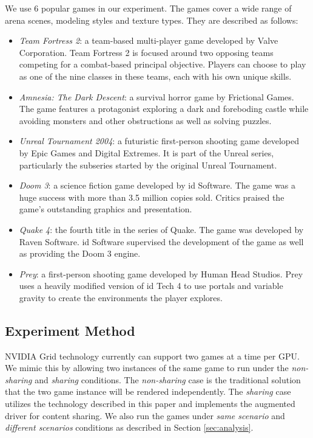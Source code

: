 \documentclass[pageno]{jpaper}
\begin{document}
We use 6 popular games in our experiment. The games cover a wide range of arena scenes, modeling styles and texture types. They are described as follows:
\begin{itemize}
	\item \emph{Team Fortress 2}: a team-based multi-player game developed by Valve Corporation. Team Fortress 2 is focused around two opposing teams competing for a combat-based principal objective. Players can choose to play as one of the nine classes in these teams, each with his own unique skills.
	\item \emph{Amnesia: The Dark Descent}: a survival horror game by Frictional Games. The game features a protagonist exploring a dark and foreboding castle while avoiding monsters and other obstructions as well as solving puzzles.
    \item \emph{Unreal Tournament 2004}: a futuristic first-person shooting game developed by Epic Games and Digital Extremes. It is part of the Unreal series, particularly the subseries started by the original Unreal Tournament.
    \item \emph{Doom 3}: a science fiction game developed by id Software. The game was a huge success with more than 3.5 million copies sold. Critics praised the game's outstanding graphics and presentation.
    \item \emph{Quake 4}: the fourth title in the series of Quake. The game was developed by Raven Software. id Software supervised the development of the game as well as providing the Doom 3 engine.
    \item \emph{Prey}: a first-person shooting game developed by Human Head Studios. Prey uses a heavily modified version of id Tech 4 to use portals and variable gravity to create the environments the player explores.
\end{itemize}

\subsection{Experiment Method}

NVIDIA Grid technology \cite{nvgrid} currently can support two games at a time per GPU. We mimic this by allowing two instances of the same game to run under the \emph{non-sharing} and \emph{sharing} conditions. The \emph{non-sharing} case is the traditional solution that the two game instance will be rendered independently. The \emph{sharing} case utilizes the technology described in this paper and implements the augmented driver for content sharing. We also run the games under \emph{same scenario} and \emph{different scenarios} conditions as described in Section \ref{sec:analysis}.
\end{document}
